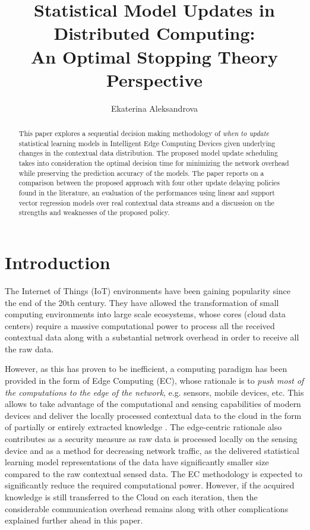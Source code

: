 \documentclass{mpaper}
\begin{document}
\title{Statistical Model Updates in Distributed Computing:\\ An Optimal Stopping Theory Perspective}
\author{Ekaterina Aleksandrova}

\maketitle

\begin{abstract}
This paper explores a sequential decision making methodology of \textit{when to update} statistical learning models in Intelligent Edge Computing Devices given underlying changes in the contextual data distribution. The proposed model update scheduling takes into consideration the optimal decision time for minimizing the network overhead while preserving the prediction accuracy of the models. The paper reports on a comparison between the proposed approach with four other update delaying policies found in the literature, an evaluation of the performances using linear and support vector regression models over real contextual data streams and a discussion on the strengths and weaknesses of the proposed policy.
\end{abstract}

\section{Introduction}
The Internet of Things (IoT) environments have been gaining popularity since the end of the 20th century. They have allowed the transformation of small computing environments into large scale ecosystems, whose cores (cloud data centers) require a massive computational 
power to process all the received contextual data along with a substantial network overhead in order to receive all the raw data.

However, as this has proven to be inefficient, a computing paradigm has been provided in the form of Edge Computing (EC), whose rationale is to \textit{push most of the computations to the edge of the network}, e.g. sensors, mobile devices, etc. This allows to take advantage of the computational and sensing capabilities of modern devices and deliver the locally processed contextual data to the cloud in the form of partially or entirely extracted knowledge \cite{anagnostop2014}.
The edge-centric rationale also contributes as a security measure as raw data is processed locally on the sensing device and as a method for decreasing network traffic, as the delivered statistical learning model representations of the data have significantly smaller size compared to the raw contextual sensed data. The EC methodology is expected to significantly reduce the required computational power. However, if the acquired knowledge is still transferred to the Cloud on each iteration, then the considerable communication overhead remains along with other complications explained further ahead in this paper. 
\end{document}
